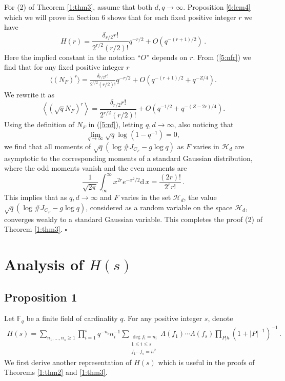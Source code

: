 \documentclass[12pt]{amsart}
\theoremstyle{plain}
\newcommand{\F}{{\mathbb F}_q}
\newcommand{\HH}{{\mathcal H}}
\newcommand{\ud}{\mathrm{d}}
\begin{document}
For (2) of Theorem \ref{1:thm3}, assume that both $d,q \to \infty$. Proposition \ref{6:lem4} which we will prove in Section 6 shows that for each fixed positive integer $r$ we have
\[H(r)= \frac{\delta_{r/2} r!}{2^{r/2} (r/2)!} q^{-r/2}+O\left(q^{-(r+1)/2}\right)\,.\]
Here the implied constant in the notation ``$O$'' depends on $r$. From (\ref{5:nfr}) we find that for any fixed positive integer $r$
\begin{eqnarray*} \langle (N_F)^r\rangle=\frac{\delta_{r/2} r!}{2^{r/2} (r/2)!} q^{-r/2}+O\left(q^{-(r+1)/2}+q^{-Z/4}\right). \end{eqnarray*}
We rewrite it as
\[\left\langle \left(\sqrt{q}N_F\right)^r \right\rangle=\frac{\delta_{r/2} r!}{2^{r/2} (r/2)!} +O\left(q^{-1/2}+q^{-(Z-2r)/4}\right).\]
Using the definition of $N_F$ in (\ref{5:nf}), letting $q,d \to \infty$, also noticing that
\[\lim_{q \to \infty}\sqrt{q}\log\left(1-q^{-1}\right)=0,\]
we find that all moments of $\sqrt{q}\left(\log \#J_{C_F}-g \log q\right)$ as $F$ varies in $\HH_d$ are asymptotic to the corresponding moments of a standard Gaussian distribution, where the odd moments vanish and the even moments are
\[\frac{1}{\sqrt{2 \pi}} \int_{\infty}^{\infty} x^{2r}e^{-x^2/2} \ud \, x = \frac{(2r)!}{2^r r!}\,.\]
This implies that as $q,d \to \infty$ and $F$ varies in the set $\HH_d$, the value $\sqrt{q}\left(\log \#J_{C_F}-g \log q\right)$, considered as a random variable on the space $\HH_d$, converges weakly to a standard Gaussian variable. This completes the proof (2) of Theorem \ref{1:thm3}. $\square$


\section{Analysis of $H(s)$}

\subsection{Proposition 1} Let $\F$ be a finite field of cardinality $q$. For any positive integer $s$, denote
\begin{eqnarray*} H(s)=\sum_{n_1,\ldots,n_s \ge 1} \prod_{i=1}^s q^{-n_i}n_i^{-1} \sum_{\substack{\deg f_i =n_i \\ 1 \le i \le s\\ f_1 \cdots f_s=h^2}} \Lambda(f_1) \cdots \Lambda(f_s)\prod_{P|h}\left(1+|P|^{-1}\right)^{-1}\,.\end{eqnarray*}
We first derive another representation of $H(s)$ which is useful in the proofs of Theorems \ref{1:thm2} and \ref{1:thm3}.
\end{document}
